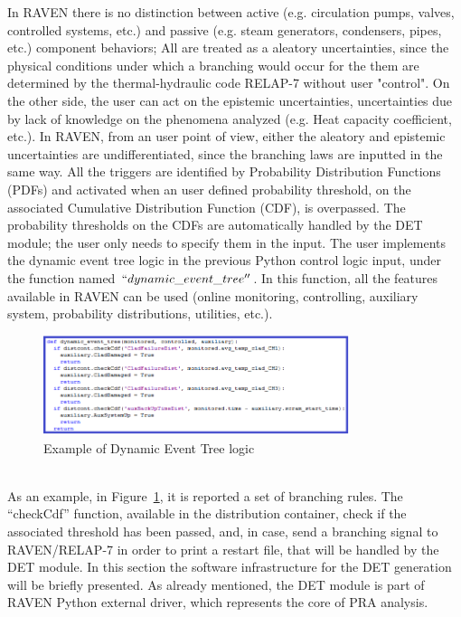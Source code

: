 \documentclass{mc2013}
\begin{document}
In RAVEN there is no distinction between active (e.g. circulation pumps, valves, controlled systems, etc.) and passive (e.g. steam generators, condensers, pipes, etc.) component behaviors; All are treated as a aleatory uncertainties, since the physical conditions under which a branching would occur for the them are determined by the thermal-hydraulic code RELAP-7 without user "control".  On the other side, the user can act on the epistemic uncertainties, uncertainties due by lack of knowledge on the phenomena analyzed (e.g. Heat capacity coefficient, etc.). 
In RAVEN, from an user point of view, either the aleatory and epistemic uncertainties are undifferentiated, since the branching laws are inputted in the same way. All the triggers are identified by Probability Distribution Functions (PDFs) and activated when an user defined probability threshold, on the associated Cumulative Distribution Function (CDF), is overpassed.
The probability thresholds on the CDFs are automatically handled by the DET module; the user only needs to specify them in the input.
The user implements the dynamic event tree logic in the previous Python control logic input, under the function named $``dynamic\_event\_tree''$. In this function, all the features available in RAVEN can be used (online monitoring, controlling, auxiliary system, probability distributions, utilities, etc.). 
\begin{figure}[h] 
  \centering
     \includegraphics[width=0.8\textwidth]{figures/BranchingLaws.png}
  \caption{Example of Dynamic Event Tree logic}
   \label{fig:DET_branchLaws}
\end{figure}
\\As an example, in Figure~\ref{fig:DET_branchLaws}, it is reported a set of branching rules. The ``checkCdf'' function, available in the distribution container, check if the associated threshold has been passed, and, in case, send a branching signal to RAVEN/RELAP-7 in order to print a restart file, that will be handled by the DET module. 
\label{sec:CPUInfrastructure}
In this section the software infrastructure for the DET generation will  be briefly presented. As already mentioned, the DET module is part of RAVEN Python external driver, which represents the core of PRA analysis.
\end{document}

